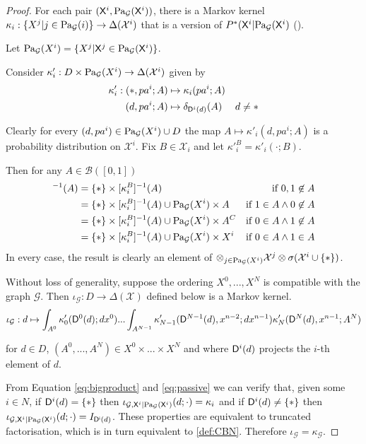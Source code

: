 \begin{proof}
For each pair $(\mathsf{X}^i,\text{Pa}_{\mathcal{G}}(\mathsf{X}^i))$, there is a Markov kernel $\kappa_i:\{X^j|j\in \text{Pa}_{\mathcal{G}}(i)\}\to \Delta(\mathcal{X}^i)$ that is a version of $P^*(\mathsf{X}^i|\text{Pa}_{\mathcal{G}}(\mathsf{X}^i)$ (\cite{cinlar_probability_2011}). 

Let $\text{Pa}_{\mathcal{G}}(X^i) = \{X^j|\mathsf{X}^j\in \text{Pa}_{\mathcal{G}}(\mathsf{X}^i)\}$.

Consider $\kappa'_i:D\times \text{Pa}_{\mathcal{G}}(X^i) \to \Delta(\mathcal{X}^i)$ given by \begin{align}
    \kappa'_i: (*,pa^i;A)&\mapsto \kappa_i(pa^i;A)&\label{eq:passive}\\
               (d,pa^i;A)&\mapsto \delta_{\mathsf{D}^i(d)}(A)&d\neq *\label{eq:npassive}
\end{align}

Clearly for every $(d,pa^i) \in \text{Pa}_{\mathcal{G}}(X^i)\cup D$ the map $A\mapsto \kappa'_i(d,pa^i;A)$ is a probability distribution on $\mathcal{X}^i$. Fix $B\in\mathcal{X}_i$ and let $\kappa'^B_i=\kappa'_i(\cdot;B)$.

Then for any $A\in \mathcal{B}([0,1])$
\begin{align}
    [\kappa'^B_i]^{-1}(A) &= \{*\}\times[\kappa^B_i]^{-1}(A) &\text{if }0,1\not\in A\\
    &= \{*\}\times[\kappa^B_i]^{-1}(A)\cup \PA{\mathcal{G}}{X^i}\times A &\text{if }1\in A\land 0\not\in A\\
    &= \{*\}\times[\kappa^B_i]^{-1}(A)\cup \PA{\mathcal{G}}{X^i}\times A^C &\text{if }0\in A\land 1\not\in A\\
    &= \{*\}\times[\kappa^B_i]^{-1}(A)\cup \PA{\mathcal{G}}{X^i}\times X^i &\text{if }0\in A\land 1\in A
\end{align}
In every case, the result is clearly an element of $\otimes_{j\in \text{Pa}_{\mathcal{G}}(X^i)} \mathcal{X}^j \otimes \sigma(\mathcal{X}^i\cup\{*\})$.

Without loss of generality, suppose the ordering $X^0,...,X^N$ is compatible with the graph $\mathcal{G}$. Then $\iota_{\mathcal{G}}:D\to \Delta(\mathcal{X})$ defined below is a Markov kernel.
\begin{align}
    \iota_{\mathcal{G}}:d\mapsto \int_{A^0} \kappa'_0(\mathsf{D}^0(d);dx^0) ... \int_{A^{N-1}} \kappa'_{N-1}(\mathsf{D}^{N-1}(d),x^{n-2};dx^{n-1}) \kappa'_N(\mathsf{D}^N(d),x^{n-1};A^N) \label{eq:bigproduct}
\end{align}

for $d\in D$, $(A^0,...,A^N)\in X^0\times...\times X^N$ and where $\mathsf{D}^i(d)$ projects the $i$-th element of $d$.

From Equation \ref{eq:bigproduct} and \ref{eq:passive} we can verify that, given some $i\in N$, if $\mathsf{D}^i(d)=\{*\}$ then $\iota_{\mathcal{G},\mathsf{X}^i|\text{Pa}_{\mathcal{G}}(\mathsf{X}^i)}(d;\cdot) = \kappa_i$ and if $\mathsf{D}^i(d)\neq\{*\}$ then $\iota_{\mathcal{G},\mathsf{X}^i|\text{Pa}_{\mathcal{G}}(\mathsf{X}^i)}(d;\cdot) = I_{\mathsf{D^i}(d)}$. These properties are equivalent to truncated factorisation, which is in turn equivalent to \ref{def:CBN}. Therefore $\iota_\mathcal{G}=\kappa_\mathcal{G}$.
\end{proof}